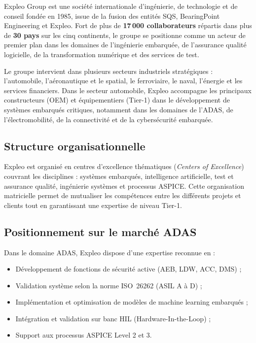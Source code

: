 \documentclass[12pt,a4paper]{report}
\begin{document}
Expleo Group est une soci\'et\'e internationale d'ing\'enierie, de technologie et de conseil fond\'ee en 1985, issue de la fusion des entit\'es SQS, BearingPoint Engineering et Expleo. Fort de plus de \textbf{17\,000 collaborateurs} r\'epartis dans plus de \textbf{30 pays} sur les cinq continents, le groupe se positionne comme un acteur de premier plan dans les domaines de l'ing\'enierie embarqu\'ee, de l'assurance qualit\'e logicielle, de la transformation num\'erique et des services de test.

Le groupe intervient dans plusieurs secteurs industriels strat\'egiques : l'automobile, l'a\'eronautique et le spatial, le ferroviaire, le naval, l'\'energie et les services financiers. Dans le secteur automobile, Expleo accompagne les principaux constructeurs (OEM) et \'equipementiers (Tier-1) dans le d\'eveloppement de syst\`emes embarqu\'es critiques, notamment dans les domaines de l'ADAS, de l'\'electromobilit\'e, de la connectivit\'e et de la cybersécurit\'e embarqu\'ee.

\subsection{Structure organisationnelle}

Expleo est organis\'e en centres d'excellence th\'ematiques (\textit{Centers of Excellence}) couvrant les disciplines : syst\`emes embarqu\'es, intelligence artificielle, test et assurance qualit\'e, ing\'enierie syst\`emes et processus ASPICE. Cette organisation matricielle permet de mutualiser les comp\'etences entre les diff\'erents projets et clients tout en garantissant une expertise de niveau Tier-1.

\subsection{Positionnement sur le march\'e ADAS}

Dans le domaine ADAS, Expleo dispose d'une expertise reconnue en :
\begin{itemize}
  \item D\'eveloppement de fonctions de s\'ecurit\'e active (AEB, LDW, ACC, DMS) ;
  \item Validation syst\`eme selon la norme ISO~26262 (ASIL A \`a D) ;
  \item Impl\'ementation et optimisation de mod\`eles de machine learning embarqu\'es ;
  \item Int\'egration et validation sur banc HIL (Hardware-In-the-Loop) ;
  \item Support aux processus ASPICE Level 2 et 3.
\end{itemize}
\end{document}
